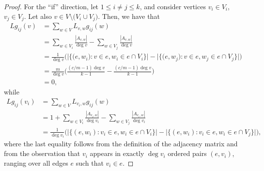\documentclass{article}
\theoremstyle{plain}
\theoremstyle{definition}
\theoremstyle{remark}
\begin{document}
\begin{proof}
    For the ``if'' direction, let $1\leq i\neq j\leq k$, and consider vertices $v_i\in V_i$,  $v_j\in V_j$. Let also $v\in V\setminus \bigl(V_i\cup V_j\bigr)$. Then, we have that
    \begin{align*}
        Lg_{ij}(v) &= \sum_{w\in V}L_{v,w}g_{ij}(w)\\
        &= \sum_{w\in V_i}\frac{|A_{v,w}|}{\deg v} - \sum_{w\in V_j}\frac{|A_{v,w}|}{\deg v}\\
        &= \frac1{\deg v} \biggl( \bigl| \bigl\{\bigl(e,w_i\bigr)\colon v\in e, w_i \in e\cap V_i\bigr\}\bigr| - \bigl| \bigl\{\bigl(e,w_j\bigr)\colon v\in e, w_j \in e\cap V_j\bigr\}\bigr| \biggr)\\
        &= \frac m{\deg v}\biggl(\frac{(c/m-1) \deg v}{k -1} - \frac{(c/m-1) \deg v}{k -1}\biggr)\\
        &= 0,
           \end{align*} while
             \begin{align*}
        Lg_{ij}(v_i) &= \sum_{w\in V}L_{v_i,w}g_{ij}(w)\\
        &= 1+\sum_{w\in V_i}\frac{|A_{v_i,w}|}{\deg v_i}-\sum_{w\in V_j}\frac{|A_{v_i,w}|}{\deg v_i}\\
        &= \frac 1{\deg v_i}\biggl(\bigl|\bigl\{(e,w_i)\colon v_i\in e, w_i\in e\cap V_i\bigr\}\bigr|-\bigl|\bigl\{(e,w_i)\colon v_i\in e, w_i\in e\cap V_j\bigr\}\bigr| \biggr),
    \end{align*}
    where the last equality follows from the definition of the adjacency matrix and from the observation that $v_i$ appears in exactly $\deg v_i$ ordered pairs $(e,v_i)$, ranging over all edges $e$ such that $v_i \in e$.


\end{proof}
\end{document}
